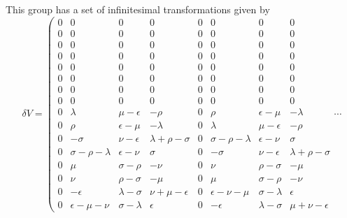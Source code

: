 \documentclass[12pt]{article}
\begin{document}
 This group has a set of infinitesimal transformations given by
\begin{displaymath}
\delta V = \left(
\begin{array}{cccccccc}
0 &   0 &  0 &  0  & 0 &  0  &  0 &  0  \\ 
0 &   0 &  0 &  0  & 0 &  0  &  0 &  0  \\ 
0 &   0 &  0 &  0  & 0 &  0  &  0 &  0  \\
0 &   0 &  0 &  0  & 0 &  0  &  0 &  0  \\
0 &   0 &  0 &  0  & 0 &  0  &  0 &  0  \\
0 &   0 &  0 &  0  & 0 &  0  &  0 &  0  \\ 
0 &   0 &  0 &  0  & 0 &  0  &  0 &  0  \\
0 &   0 &  0 &  0  & 0 &  0  &  0 &  0  \\
0 &   \lambda & \mu-\epsilon& -\rho  & 0 &  \rho  & \epsilon-\mu& -\lambda  \\ 
0 &   \rho & \epsilon-\mu& -\lambda  & 0 &  \lambda  & \mu-\epsilon& -\rho  \\
0 &  -\sigma & \nu-\epsilon&\lambda+\rho-\sigma& 0 &\sigma-\rho-\lambda& \epsilon-\nu&  \sigma  \\
0 &\sigma-\rho-\lambda& \epsilon-\nu&  \sigma  & 0 & -\sigma  & \nu-\epsilon&\lambda+\rho-\sigma \\
0 &   \mu & \sigma-\rho& -\nu  & 0 &  \nu  & \rho-\sigma& -\mu  \\ 
0 &   \nu & \rho-\sigma& -\mu  & 0 &  \mu  & \sigma-\rho& -\nu  \\
0 &  -\epsilon & \lambda-\sigma&\nu+\mu-\epsilon& 0 &\epsilon-\nu-\mu& \sigma-\lambda&  \epsilon  \\ 
0 &\epsilon-\mu-\nu& \sigma-\lambda&  \epsilon  & 0 & -\epsilon  & \lambda-\sigma&\mu+\nu-\epsilon
\end{array} \right. \cdots
\end{displaymath}
\end{document}
